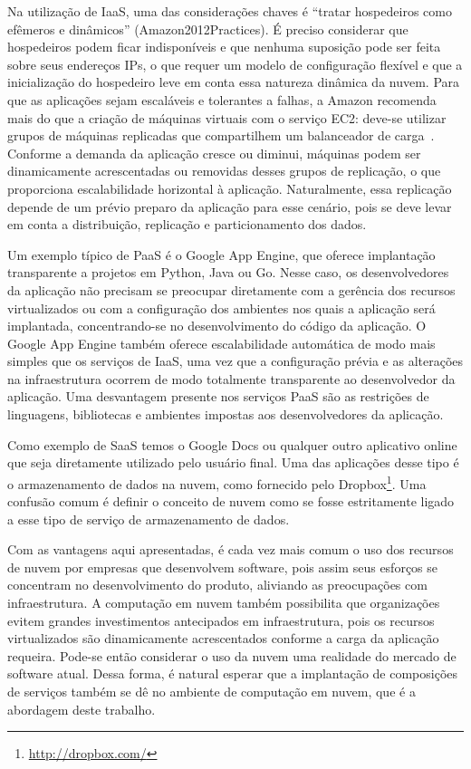 Na utilização de IaaS, uma das considerações chaves é ``tratar hospedeiros como efêmeros e dinâmicos'' (Amazon2012Practices). É preciso considerar que hospedeiros podem ficar indisponíveis e que nenhuma suposição pode ser feita sobre seus endereços IPs, o que requer um modelo de configuração flexível e que a inicialização do hospedeiro leve em conta essa natureza dinâmica da nuvem. Para que as aplicações sejam escaláveis e tolerantes a falhas, a Amazon recomenda mais do que a criação de máquinas virtuais com o serviço EC2: deve-se utilizar grupos de máquinas replicadas que compartilhem um balanceador de carga~\cite{Amazon2012Practices}. Conforme a demanda da aplicação cresce ou diminui, máquinas podem ser dinamicamente acrescentadas ou removidas desses grupos de replicação, o que proporciona escalabilidade horizontal à aplicação. Naturalmente, essa replicação depende de um prévio preparo da aplicação para esse cenário, pois se deve levar em conta a distribuição, replicação e particionamento dos dados. 

Um exemplo típico de PaaS é o Google App Engine, que oferece implantação transparente a projetos em Python, Java ou Go. Nesse caso, os desenvolvedores da aplicação não precisam se preocupar diretamente com a gerência dos recursos virtualizados ou com a configuração dos ambientes nos quais a aplicação será implantada, concentrando-se no desenvolvimento do código da aplicação. O Google App Engine também oferece escalabilidade automática de modo mais simples que os serviços de IaaS, uma vez que a configuração prévia e as alterações na infraestrutura ocorrem de modo totalmente transparente ao desenvolvedor da aplicação. Uma desvantagem presente nos serviços PaaS são as restrições de linguagens, bibliotecas e ambientes impostas aos desenvolvedores da aplicação.

Como exemplo de SaaS temos o Google Docs ou qualquer outro aplicativo online que seja diretamente utilizado pelo usuário final. Uma das aplicações desse tipo é o armazenamento de dados na nuvem, como fornecido pelo Dropbox\footnote{\url{http://dropbox.com/}}. Uma confusão comum é definir o conceito de nuvem como se fosse estritamente ligado a esse tipo de serviço de armazenamento de dados.

Com as vantagens aqui apresentadas, é cada vez mais comum o uso dos recursos de nuvem por empresas que desenvolvem software, pois assim seus esforços se concentram no desenvolvimento do produto, aliviando as preocupações com infraestrutura. A computação em nuvem também possibilita que organizações evitem grandes investimentos antecipados em infraestrutura, pois os recursos virtualizados são dinamicamente acrescentados conforme a carga da aplicação requeira. Pode-se então considerar o uso da nuvem uma realidade do mercado de software atual. Dessa forma, é natural esperar que a implantação de composições de serviços também se dê no ambiente de computação em nuvem, que é a abordagem deste trabalho. 
